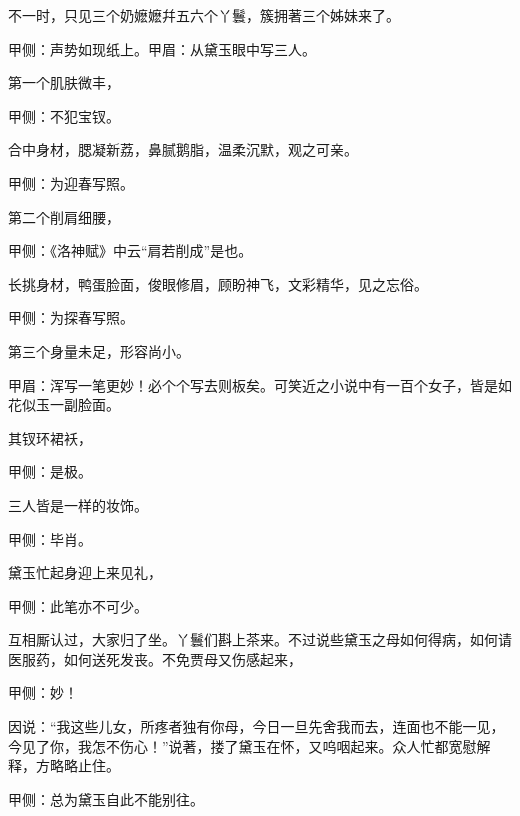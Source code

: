 \begin{parag}
    不一时，只见三个奶嬷嬷幷五六个丫鬟，簇拥著三个姊妹来了。\begin{note}甲侧：声势如现纸上。甲眉：从黛玉眼中写三人。\end{note}第一个肌肤微丰，\begin{note}甲侧：不犯宝钗。\end{note}合中身材，腮凝新荔，鼻腻鹅脂，温柔沉默，观之可亲。\begin{note}甲侧：为迎春写照。\end{note}第二个削肩细腰，\begin{note}甲侧：《洛神赋》中云“肩若削成”是也。\end{note}长挑身材，鸭蛋脸面，俊眼修眉，顾盼神飞，文彩精华，见之忘俗。\begin{note}甲侧：为探春写照。\end{note}第三个身量未足，形容尚小。\begin{note}甲眉：浑写一笔更妙！必个个写去则板矣。可笑近之小说中有一百个女子，皆是如花似玉一副脸面。\end{note}其钗环裙袄，\begin{note}甲侧：是极。\end{note}三人皆是一样的妆饰。\begin{note}甲侧：毕肖。\end{note}黛玉忙起身迎上来见礼，\begin{note}甲侧：此笔亦不可少。\end{note}互相厮认过，大家归了坐。丫鬟们斟上茶来。不过说些黛玉之母如何得病，如何请医服药，如何送死发丧。不免贾母又伤感起来，\begin{note}甲侧：妙！\end{note}因说：“我这些儿女，所疼者独有你母，今日一旦先舍我而去，连面也不能一见，今见了你，我怎不伤心！”说著，搂了黛玉在怀，又呜咽起来。众人忙都宽慰解释，方略略止住。\begin{note}甲侧：总为黛玉自此不能别往。\end{note}
\end{parag}


